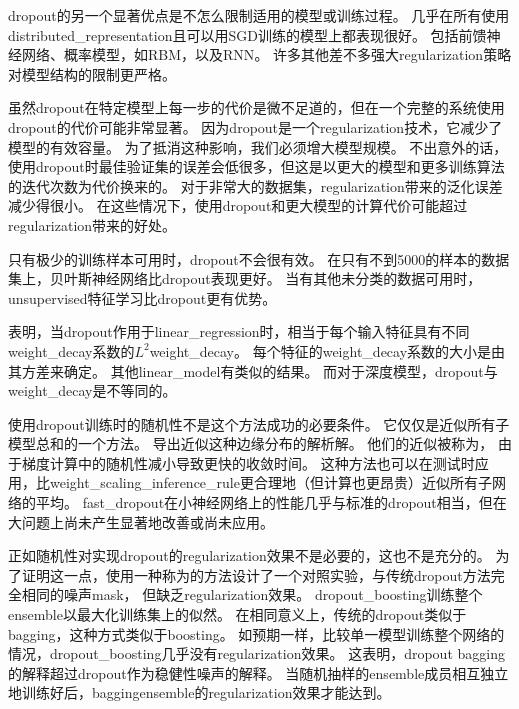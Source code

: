 
\gls{dropout}的另一个显著优点是不怎么限制适用的模型或训练过程。
几乎在所有使用\gls{distributed_representation}且可以用\gls{SGD}训练的模型上都表现很好。
包括前馈神经网络、概率模型，如\gls{RBM}\citep{Srivastava14}，以及\gls{RNN}\citep{Bayer-et-al-arXiv-2014,Pascanu-et-al-ICLR2014}。
许多其他差不多强大\gls{regularization}策略对模型结构的限制更严格。

虽然\gls{dropout}在特定模型上每一步的代价是微不足道的，但在一个完整的系统使用\gls{dropout}的代价可能非常显著。
因为\gls{dropout}是一个\gls{regularization}技术，它减少了模型的有效容量。
为了抵消这种影响，我们必须增大模型规模。
不出意外的话，使用\gls{dropout}时最佳验证集的误差会低很多，但这是以更大的模型和更多训练算法的迭代次数为代价换来的。
对于非常大的数据集，\gls{regularization}带来的泛化误差减少得很小。
在这些情况下，使用\gls{dropout}和更大模型的计算代价可能超过\gls{regularization}带来的好处。

只有极少的训练样本可用时，\gls{dropout}不会很有效。
在只有不到5000的样本的数据集上\citep{Xiong2011}，贝叶斯神经网络\citep{Neal1996}比\gls{dropout}表现更好\citep{Srivastava14}。
当有其他未分类的数据可用时，\gls{unsupervised}特征学习比\gls{dropout}更有优势。


\cite{Wager+al-2013}表明，当\gls{dropout}作用于\gls{linear_regression}时，相当于每个输入特征具有不同\gls{weight_decay}系数的$L^2$\gls{weight_decay}。 每个特征的\gls{weight_decay}系数的大小是由其方差来确定。
其他\gls{linear_model}有类似的结果。
而对于深度模型，\gls{dropout}与\gls{weight_decay}是不等同的。


使用\gls{dropout}训练时的随机性不是这个方法成功的必要条件。
它仅仅是近似所有子模型总和的一个方法。
\cite{WangManning-ICML2013-small}导出近似这种边缘分布的解析解。
他们的近似被称为， 由于梯度计算中的随机性减小导致更快的收敛时间。
这种方法也可以在测试时应用，比\gls{weight_scaling_inference_rule}更合理地（但计算也更昂贵）近似所有子网络的平均。
\gls{fast_dropout}在小神经网络上的性能几乎与标准的\gls{dropout}相当，但在大问题上尚未产生显著地改善或尚未应用。


正如随机性对实现\gls{dropout}的\gls{regularization}效果不是必要的，这也不是充分的。
为了证明这一点，\cite{WardeFarley+al-ICLR2014}使用一种称为的方法设计了一个对照实验，与传统\gls{dropout}方法完全相同的噪声\gls{mask}， 但缺乏\gls{regularization}效果。
\gls{dropout_boosting}训练整个\gls{ensemble}以最大化训练集上的似然。
在相同意义上，传统的\gls{dropout}类似于\gls{bagging}，这种方式类似于\gls{boosting}。
如预期一样，比较单一模型训练整个网络的情况，\gls{dropout_boosting}几乎没有\gls{regularization}效果。
这表明，\gls{dropout} \gls{bagging}的解释超过\gls{dropout}作为稳健性噪声的解释。
当随机抽样的\gls{ensemble}成员相互独立地训练好后，\gls{bagging}\gls{ensemble}的\gls{regularization}效果才能达到。

